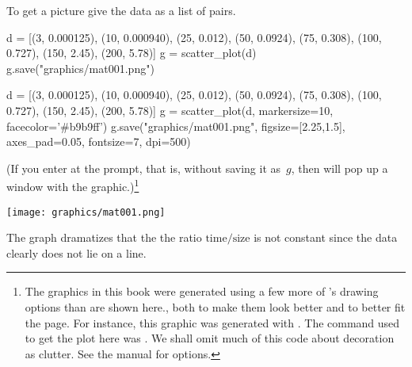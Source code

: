 To get a picture give \Sage{} the data as a list of pairs.
\begin{sageoutput}
d = [(3, 0.000125), (10, 0.000940), (25, 0.012),  
     (50, 0.0924), (75, 0.308), (100, 0.727), 
     (150, 2.45), (200, 5.78)]
g = scatter_plot(d)  
g.save("graphics/mat001.png")            
\end{sageoutput}
\begin{sagesilent}
d = [(3, 0.000125), (10, 0.000940), (25, 0.012),  
     (50, 0.0924), (75, 0.308), (100, 0.727), 
     (150, 2.45), (200, 5.78)]
g = scatter_plot(d, markersize=10, facecolor='#b9b9ff')
g.save("graphics/mat001.png", figsize=[2.25,1.5], axes_pad=0.05, fontsize=7, dpi=500)              
\end{sagesilent}
\noindent
(If you enter  at the prompt, that is, 
without saving it as~$g$, then \Sage{} will pop up a window with the
graphic.)\footnote{The graphics in this book were generated using a few 
more of \protect\Sage's drawing options than are shown here.,
both to make them look better and to better fit the page.
For instance, this graphic was generated with 
\protect{}.
The \protect\Sage{} command used to get the plot here was 
\protect{}.
We shall omit much of this code about decoration as clutter.
See the \protect\Sage{} manual for \protect{} options.}
\begin{center}
  \texttt{[image: graphics/mat001.png]}
\end{center}
The graph dramatizes that the the ratio $\text{time}/\text{size}$
is not constant
since the data clearly does not lie on a line.

